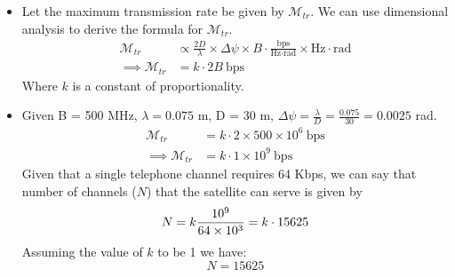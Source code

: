 \documentclass[titlepage]{article}
\begin{document}
\begin{itemize}
    \item Let the maximum transmission rate be given by $\mathcal{M}_{tr}$. We can use dimensional analysis to derive the formula for $\mathcal{M}_{tr}$.
          \begin{align}
              \mathcal{M}_{tr}          & \propto \frac{2D}{\lambda} \times \Delta \psi \times B \cdot \frac{\text{bps}}{\text{Hz}\cdot\text{rad}} \times \text{Hz} \cdot \text{rad} \nonumber \\
              \implies \mathcal{M}_{tr} & = k\cdot 2B \ \text{bps}
          \end{align}
          Where $k$ is a constant of proportionality.
    \item Given B = 500 MHz, $\lambda = 0.075$ m, D = 30 m, $\Delta \psi = \frac{\lambda}{D} = \frac{0.075}{30} = 0.0025$ rad.
          \begin{align}
              \mathcal{M}_{tr}          & = k\cdot 2\times 500 \times 10^6 \ \text{bps} \nonumber \\
              \implies \mathcal{M}_{tr} & = k \cdot 1 \times 10^9 \ \text{bps}
          \end{align}
          Given that a single telephone channel requires 64 Kbps, we can say that number of channels ($N$) that the satellite can serve is given by
          \begin{equation}
              N = k \frac{10^9}{64 \times 10^3} = k \cdot 15625 \\
          \end{equation}
          Assuming the value of $k$ to be 1 we have:
            \begin{equation}
                \boxed{N = 15625} \nonumber
            \end{equation}

\end{itemize}
\end{document}
